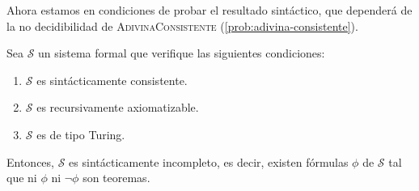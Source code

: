 Ahora estamos en condiciones de probar el resultado sintáctico, que dependerá de la no decidibilidad de \textsc{AdivinaConsistente} (\cref{prob:adivina-consistente}). \cite{Aaronson2017}

\begin{teorema}\label{teo:incompletitud-sintactica}
Sea $\mathcal{S}$ un sistema formal que verifique las siguientes condiciones:
\begin{enumerate}
    \item $\mathcal{S}$ es sintácticamente consistente.
    \item $\mathcal{S}$ es recursivamente axiomatizable.
    \item $\mathcal{S}$ es de tipo Turing.
\end{enumerate}
Entonces, $\mathcal{S}$ es sintácticamente incompleto, es decir, existen fórmulas $\phi$ de $\mathcal{S}$ tal que ni $\phi$ ni $\neg\phi$ son teoremas.
\end{teorema}
